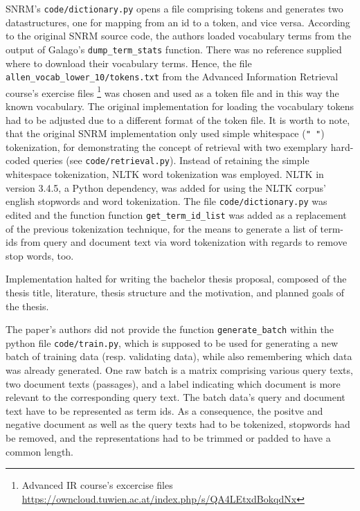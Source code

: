 SNRM's \texttt{code/dictionary.py} opens a file comprising tokens and generates two datastructures, one for mapping from an id to a token, 
    and vice versa.
According to the original SNRM source code, the authors loaded vocabulary terms from the output of Galago's \verb|dump_term_stats| function.
There was no reference supplied where to download their vocabulary terms.
Hence, the file \verb|allen_vocab_lower_10/tokens.txt| from the Advanced Information Retrieval course's exercise files 
    \footnote{Advanced IR course's excercise files \url{https://owncloud.tuwien.ac.at/index.php/s/QA4LEtxdBokqdNx}}
    was chosen and used as a token file and in this way the known vocabulary.
The original implementation for loading the vocabulary tokens had to be adjusted due to a different format of the token file.
It is worth to note, that the original SNRM implementation only used simple whitespace (\verb|" "|) tokenization, for demonstrating
    the concept of retrieval with two exemplary hard-coded queries (see \texttt{code/retrieval.py}).
Instead of retaining the simple whitespace tokenization, NLTK word tokenization was employed.
NLTK in version 3.4.5, a Python dependency, was added for using the NLTK corpus' english stopwords and word tokenization.
The file \texttt{code/dictionary.py} was edited and the function function \verb|get_term_id_list| was added as a 
    replacement of the previous tokenization technique, for the means to generate a list of term-ids from 
    query and document text via word tokenization with regards to remove stop words, too.







Implementation halted for writing the bachelor thesis proposal, composed of the thesis title, literature, thesis structure and the motivation, 
    and planned goals of the thesis.

The paper's authors did not provide the function \verb|generate_batch| within the python file \verb|code/train.py|, 
    which is supposed to be used for generating a new batch of training data (resp. validating data), while also remembering which 
    data was already generated.
One raw batch is a matrix comprising various query texts, two document texts (passages), and a label indicating which document 
    is more relevant to the corresponding query text.
The batch data's query and document text have to be represented as term ids. 
As a consequence, the positve and negative document as well as the query texts had to be tokenized, stopwords had be removed,
    and the representations had to be trimmed or padded to have a common length.

